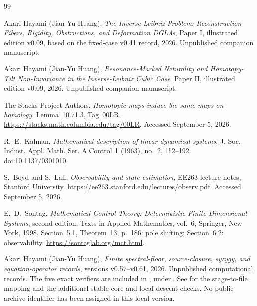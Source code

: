 \documentclass[11pt]{amsart}
\theoremstyle{definition}
\begin{document}
\begin{thebibliography}{99}
\raggedright

Akari Hayami (Jian-Yu Huang),
\emph{The Inverse Leibniz Problem: Reconstruction Fibers, Rigidity, Obstructions, and Deformation DGLAs},
Paper I, illustrated edition v0.09, based on the fixed-case v0.41 record, 2026.
Unpublished companion manuscript.

Akari Hayami (Jian-Yu Huang),
\emph{Resonance-Marked Naturality and Homotopy-Tilt Non-Invariance in the Inverse-Leibniz Cubic Case},
Paper II, illustrated edition v0.09, 2026. Unpublished companion manuscript.


The Stacks Project Authors,
\emph{Homotopic maps induce the same maps on homology},
Lemma~10.71.3, Tag~00LR.
\url{https://stacks.math.columbia.edu/tag/00LR}. Accessed September 5, 2026.

R.~E.~Kalman,
\emph{Mathematical description of linear dynamical systems},
J. Soc. Indust. Appl. Math. Ser. A Control \textbf{1} (1963), no.~2, 152--192.
\href{https://doi.org/10.1137/0301010}{doi:10.1137/0301010}.

S.~Boyd and S.~Lall,
\emph{Observability and state estimation},
EE263 lecture notes, Stanford University.
\url{https://ee263.stanford.edu/lectures/observ.pdf}. Accessed September 5, 2026.

E.~D.~Sontag,
\emph{Mathematical Control Theory: Deterministic Finite Dimensional Systems},
second edition, Texts in Applied Mathematics, vol.~6, Springer, New York, 1998.
Section~5.1, Theorem~13, p.~186: pole shifting; Section~6.2: observability.
\url{https://sontaglab.org/mct.html}.

Akari Hayami (Jian-Yu Huang),
\emph{Finite spectral-floor, source-closure, syzygy, and equation-operator records},
versions v0.57--v0.61, 2026. Unpublished computational records.
The five exact verifiers are included in
, under
.
See  for the stage-to-file mapping and the
additional stable-core and local-descent checks. No public archive
identifier has been assigned in this local version.
\end{thebibliography}
\end{document}
